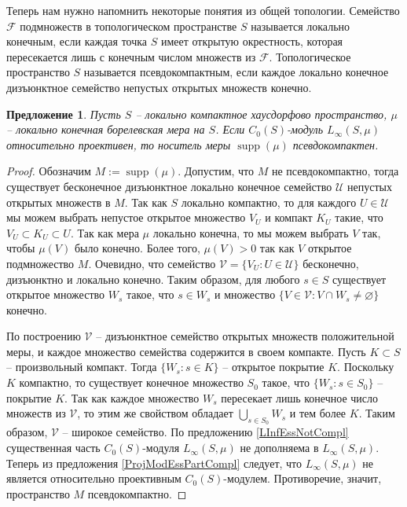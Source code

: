 \documentclass[12pt]{article}
\newtheorem{proposition}[theorem]{Предложение}
\begin{document}
Теперь нам нужно напомнить некоторые понятия из общей топологии. Семейство $\mathcal{F}$ подмножеств в топологическом пространстве $S$ называется локально конечным, если каждая точка $S$ имеет открытую окрестность, которая пересекается лишь с конечным числом множеств из $\mathcal{F}$. Топологическое пространство $S$ называется псевдокомпактным, если каждое локально конечное дизъюнктное семейство непустых открытых множеств конечно.

\begin{proposition}\label{LInfRelProjSuppCond} Пусть $S$ -- локально компактное хаусдорфово пространство, $\mu$ -- локально конечная борелевская мера на $S$. Если $C_0(S)$-модуль $L_\infty(S,\mu)$ относительно проективен, то носитель меры $\operatorname{supp}(\mu)$ псевдокомпактен.
\end{proposition}
\begin{proof} Обозначим $M:=\operatorname{supp}(\mu)$. Допустим, что $M$ не псевдокомпактно, тогда существует бесконечное дизъюнктное локально конечное семейство $\mathcal{U}$ непустых открытых множеств в $M$. Так как $S$ локально компактно, то для каждого $U\in\mathcal{U}$ мы можем выбрать непустое открытое множество $V_U$ и компакт $K_U$ такие, что $V_U\subset K_U\subset  U$. Так как мера $\mu$ локально конечна, то мы можем выбрать $V$ так, чтобы $\mu(V)$ было конечно. Более того, $\mu(V)>0$ так как $V$ открытое подмножество $M$. Очевидно, что семейство $\mathcal{V}=\{V_U:U\in\mathcal{U}\}$ бесконечно, дизъюнктно и локально конечно. Таким образом, для любого $s\in S$ существует открытое множество $W_s$ такое, что $s\in W_s$ и множество $\{V\in\mathcal{V}: V\cap W_s\neq\varnothing\}$ конечно.

    По построению $\mathcal{V}$ -- дизъюнктное семейство открытых множеств положительной меры, и каждое множество семейства содержится в своем компакте. Пусть $K\subset S$ -- произвольный компакт. Тогда $\{W_s:s\in K\}$ -- открытое покрытие $K$. Поскольку $K$ компактно, то существует конечное множество $S_0$ такое, что $\{W_s:s\in S_0\}$ -- покрытие $K$. Так как каждое множество $W_s$ пересекает лишь конечное число множеств из $\mathcal{V}$, то этим же свойством обладает $\bigcup_{s\in S_0}W_s$ и тем более $K$. Таким образом, $\mathcal{V}$ -- широкое семейство. По предложению \ref{LInfEssNotCompl} существенная часть $C_0(S)$-модуля $L_\infty(S,\mu)$ не дополняема в $L_\infty(S,\mu)$. Теперь из предложения \ref{ProjModEssPartCompl} следует, что $L_\infty(S,\mu)$ не является относительно проективным $C_0(S)$-модулем. Противоречие, значит, пространство $M$ псевдокомпактно.
\end{proof}
\end{document}
